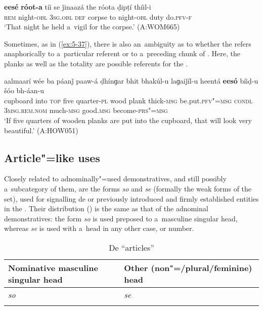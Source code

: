 \begin{exe}
\ex
\label{ex:5-36}
\gll \textbf{eesé} \textbf{róot-a} tíi se ǰinaazá the róota ḍipṭí thíil-i\\
\textsc{rem} night-\textsc{obl} \textsc{3sg.obl} \textsc{def} corpse to night-\textsc{obl} duty do.\textsc{pfv-f}\\
\glt `That night he held a~vigil for the corpse.' (A:WOM665)
\end{exe}

Sometimes, as in (\ref{ex:5-37}), there is also an~ambiguity as to whether the  refers anaphorically to a~particular  referent or to a~preceding chunk of . Here, the planks as well as the totality are possible referents for the .

\ea
\label{ex:5-37}
\gll aalmaarí wée ba páanǰ paaw-á ḍhínɡar bhit bhakúl-u laɡaiǰíl-u heentá \textbf{eesó} bíiḍ-u šóo bh-áan-u \\
cupboard into \textsc{top} five quarter-\textsc{pl} wood plank thick-\textsc{msg} be.put.\textsc{pfv"=msg} \textsc{condl} \textsc{3msg.rem.nom} much-\textsc{msg} good.\textsc{msg} become-\textsc{prs"=msg}\\
\glt `If five quarters of wooden planks are put into the cupboard, that will look very beautiful.'
(A:HOW051)
\z



\subsection{Article"=like uses}
\label{subsec:5-2-6}

Closely related to adnominally"=used demonstratives, and still possibly a~subcategory of them, are the forms \textit{so} and \textit{se} (formally the weak forms of the  set), used for signalling de or previously introduced and firmly established entities in the . Their distribution () is the same as that of the adnominal demonstratives: the form \textit{so} is used preposed to a~masculine singular  head, whereas \textit{se} is used with a~head in any other case,  or number. 


\begin{table}[ht]
 \caption{De ``articles''}
\begin{tabularx}{\textwidth}{ Q Q }
\lsptoprule
Nominative masculine singular head &
Other (non"=/plural/feminine) head\\\midrule
\textit{so} &
\textit{se} \\\lspbottomrule
\end{tabularx}
\label{tab:5-5}
\end{table}

